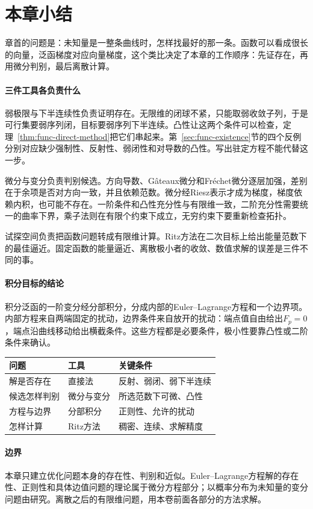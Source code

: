 \section{本章小结}
\label{sec:func-summary}

章首的问题是：未知量是一整条曲线时，怎样找最好的那一条。函数可以看成很长的向量，泛函梯度对应向量梯度，这个类比决定了本章的工作顺序：先证存在，再用微分判别，最后离散计算。

\paragraph{三件工具各负责什么}
弱极限与下半连续性负责证明存在。无限维的闭球不紧，只能取弱收敛子列，于是可行集要弱序列闭，目标要弱序列下半连续。凸性让这两个条件可以检查，定理~\ref{thm:func-direct-method}把它们串起来。第~\ref{sec:func-existence}节的四个反例分别对应缺少强制性、反射性、弱闭性和对导数的凸性。写出驻定方程不能代替这一步。

微分与变分负责判别候选。方向导数、Gâteaux微分和Fréchet微分逐层加强，差别在于余项是否对方向一致，并且依赖范数。微分经Riesz表示才成为梯度，梯度依赖内积，也可能不存在。一阶条件和凸性充分性与有限维一致，二阶充分性需要统一的曲率下界，乘子法则在有限个约束下成立，无穷约束下要重新检查拓扑。

试探空间负责把函数问题转成有限维计算。Ritz方法在二次目标上给出能量范数下的最佳逼近。固定函数的能量逼近、离散极小者的收敛、数值求解的误差是三件不同的事。

\paragraph{积分目标的结论}
积分泛函的一阶变分经分部积分，分成内部的Euler--Lagrange方程和一个边界项。内部方程来自两端固定的扰动，边界条件来自放开的扰动：端点值自由给出$F_p=0$，端点沿曲线移动给出横截条件。这些方程都是必要条件，极小性要靠凸性或二阶条件来确认。

\begin{BookInlineTable}
  \centering
  \caption{本章的问题、工具与条件。}
  \label{tab:func-summary}
  \begin{tabular}{lll}
    \toprule
    问题 & 工具 & 关键条件\\
    \midrule
    解是否存在 & 直接法 & 反射、弱闭、弱下半连续\\
    候选怎样判别 & 微分与变分 & 所选范数下可微、凸性\\
    方程与边界 & 分部积分 & 正则性、允许的扰动\\
    怎样计算 & Ritz方法 & 稠密、连续、求解精度\\
    \bottomrule
  \end{tabular}
\end{BookInlineTable}

\paragraph{边界}
本章只建立优化问题本身的存在性、判别和近似。Euler--Lagrange方程解的存在性、正则性和具体边值问题的理论属于微分方程部分；以概率分布为未知量的变分问题由研究。离散之后的有限维问题，用本卷前面各部分的方法求解。

